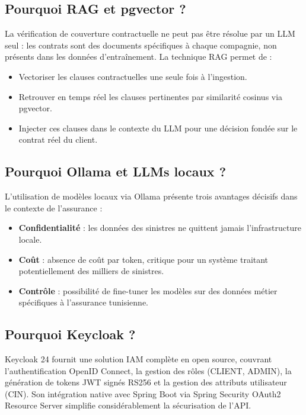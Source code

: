 \subsection{Pourquoi RAG et pgvector ?}

La vérification de couverture contractuelle ne peut pas être résolue par un LLM
seul : les contrats sont des documents spécifiques à chaque compagnie, non présents
dans les données d'entraînement. La technique RAG permet de :
\begin{itemize}
  \item Vectoriser les clauses contractuelles une seule fois à l'ingestion.
  \item Retrouver en temps réel les clauses pertinentes par similarité cosinus
        via pgvector.
  \item Injecter ces clauses dans le contexte du LLM pour une décision fondée
        sur le contrat réel du client.
\end{itemize}

\subsection{Pourquoi Ollama et LLMs locaux ?}

L'utilisation de modèles locaux via Ollama présente trois avantages décisifs
dans le contexte de l'assurance :
\begin{itemize}
  \item \textbf{Confidentialité} : les données des sinistres ne quittent jamais
        l'infrastructure locale.
  \item \textbf{Coût} : absence de coût par token, critique pour un système
        traitant potentiellement des milliers de sinistres.
  \item \textbf{Contrôle} : possibilité de fine-tuner les modèles sur des données
        métier spécifiques à l'assurance tunisienne.
\end{itemize}

\subsection{Pourquoi Keycloak ?}

Keycloak 24 fournit une solution IAM complète en open source, couvrant
l'authentification OpenID Connect, la gestion des rôles (CLIENT, ADMIN),
la génération de tokens JWT signés RS256 et la gestion des attributs utilisateur
(CIN). Son intégration native avec Spring Boot via Spring Security OAuth2 Resource
Server simplifie considérablement la sécurisation de l'API.


